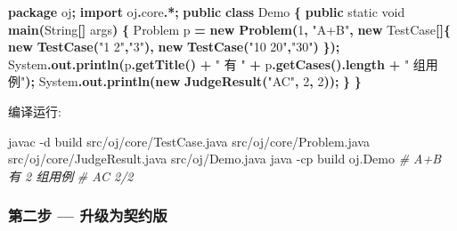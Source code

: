 \documentclass[
  11pt,
]{ctexart}
\newenvironment{Shaded}{\begin{snugshade}}{\end{snugshade}}
\newcommand{\AttributeTok}[1]{\textcolor[rgb]{0.13,0.29,0.53}{#1}}
\newcommand{\BuiltInTok}[1]{#1}
\newcommand{\CommentTok}[1]{\textcolor[rgb]{0.56,0.35,0.01}{\textit{#1}}}
\newcommand{\DataTypeTok}[1]{\textcolor[rgb]{0.13,0.29,0.53}{#1}}
\newcommand{\DecValTok}[1]{\textcolor[rgb]{0.00,0.00,0.81}{#1}}
\newcommand{\ExtensionTok}[1]{#1}
\newcommand{\FunctionTok}[1]{\textcolor[rgb]{0.13,0.29,0.53}{\textbf{#1}}}
\newcommand{\ImportTok}[1]{#1}
\newcommand{\KeywordTok}[1]{\textcolor[rgb]{0.13,0.29,0.53}{\textbf{#1}}}
\newcommand{\NormalTok}[1]{#1}
\newcommand{\OperatorTok}[1]{\textcolor[rgb]{0.81,0.36,0.00}{\textbf{#1}}}
\newcommand{\StringTok}[1]{\textcolor[rgb]{0.31,0.60,0.02}{#1}}
\begin{document}
\begin{Shaded}
\begin{Highlighting}[]
\KeywordTok{package}\ImportTok{ oj}\OperatorTok{;}
\KeywordTok{import} \ImportTok{oj}\OperatorTok{.}\ImportTok{core}\OperatorTok{.*;}
\KeywordTok{public} \KeywordTok{class}\NormalTok{ Demo }\OperatorTok{\{}
    \KeywordTok{public} \DataTypeTok{static} \DataTypeTok{void} \FunctionTok{main}\OperatorTok{(}\BuiltInTok{String}\OperatorTok{[]}\NormalTok{ args}\OperatorTok{)} \OperatorTok{\{}
\NormalTok{        Problem p }\OperatorTok{=} \KeywordTok{new} \FunctionTok{Problem}\OperatorTok{(}\DecValTok{1}\OperatorTok{,} \StringTok{"A+B"}\OperatorTok{,} \KeywordTok{new}\NormalTok{ TestCase}\OperatorTok{[]\{} \KeywordTok{new} \FunctionTok{TestCase}\OperatorTok{(}\StringTok{"1 2"}\OperatorTok{,}\StringTok{"3"}\OperatorTok{),} \KeywordTok{new} \FunctionTok{TestCase}\OperatorTok{(}\StringTok{"10 20"}\OperatorTok{,}\StringTok{"30"}\OperatorTok{)} \OperatorTok{\});}
        \BuiltInTok{System}\OperatorTok{.}\FunctionTok{out}\OperatorTok{.}\FunctionTok{println}\OperatorTok{(}\NormalTok{p}\OperatorTok{.}\FunctionTok{getTitle}\OperatorTok{()} \OperatorTok{+} \StringTok{" 有 "} \OperatorTok{+}\NormalTok{ p}\OperatorTok{.}\FunctionTok{getCases}\OperatorTok{().}\FunctionTok{length} \OperatorTok{+} \StringTok{" 组用例"}\OperatorTok{);}
        \BuiltInTok{System}\OperatorTok{.}\FunctionTok{out}\OperatorTok{.}\FunctionTok{println}\OperatorTok{(}\KeywordTok{new} \FunctionTok{JudgeResult}\OperatorTok{(}\StringTok{"AC"}\OperatorTok{,} \DecValTok{2}\OperatorTok{,} \DecValTok{2}\OperatorTok{));}
    \OperatorTok{\}}
\OperatorTok{\}}
\end{Highlighting}
\end{Shaded}

编译运行:

\begin{Shaded}
\begin{Highlighting}[]
\ExtensionTok{javac} \AttributeTok{{-}d}\NormalTok{ build src/oj/core/TestCase.java src/oj/core/Problem.java src/oj/core/JudgeResult.java src/oj/Demo.java}
\ExtensionTok{java} \AttributeTok{{-}cp}\NormalTok{ build oj.Demo}
\CommentTok{\# A+B 有 2 组用例}
\CommentTok{\# AC 2/2}
\end{Highlighting}
\end{Shaded}

\hypertarget{ux7b2cux4e8cux6b65-ux5347ux7ea7ux4e3aux5951ux7ea6ux7248}{%
\subsubsection{\texorpdfstring{第二步 \GC ---
升级为契约版}{第二步 --- 升级为契约版}}\label{ux7b2cux4e8cux6b65-ux5347ux7ea7ux4e3aux5951ux7ea6ux7248}}
\end{document}
